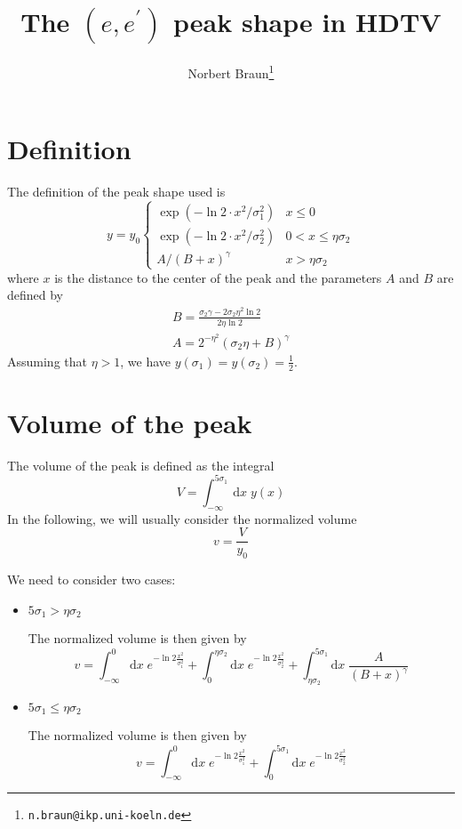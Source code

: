 \documentclass[a4paper]{article}
\begin{document}
\title{The $(e,e^\prime)$ peak shape in HDTV}
\author{Norbert Braun\thanks{\texttt{n.braun@ikp.uni-koeln.de}}}
\maketitle
\section{Definition}
The definition of the peak shape used is
\begin{equation}
y = y_0 \left\{ 
\begin{array}{ll}
\exp(-\ln 2 \cdot x^2/\sigma_1^2) & x \le 0\\
\exp(-\ln 2 \cdot x^2/\sigma_2^2) & 0 < x \le \eta\sigma_2\\
A / (B + x)^\gamma                & x > \eta\sigma_2
\end{array}
\right.
\end{equation}
where $x$ is the distance to the center of the peak and the parameters $A$ and $B$ are defined by
\begin{eqnarray}
B = \frac{\sigma_2\gamma - 2\sigma_2 \eta^2 \ln 2}{2 \eta \ln 2}\\
A = 2^{-\eta^2} (\sigma_2\eta + B)^\gamma
\end{eqnarray}
Assuming that $\eta > 1$, we have $y(\sigma_1) = y(\sigma_2) = \frac{1}{2}$.

\section{Volume of the peak}
The volume of the peak is defined as the integral
\begin{equation}
V = \int_{-\infty}^{5\sigma_1} \mathrm{d}x\; y(x)
\end{equation}
In the following, we will usually consider the normalized volume
\begin{equation}
v = \frac{V}{y_0}
\end{equation}

We need to consider two cases:
\begin{itemize}
\item $5\sigma_1 > \eta\sigma_2$

The normalized volume is then given by
\begin{equation}
v = \int_{-\infty}^0 \mathrm{d}x\;e^{-\ln 2 \frac{x^2}{\sigma_1^2}}
+ \int_0^{\eta\sigma_2}\mathrm{d}x\;e^{-\ln 2 \frac{x^2}{\sigma_2^2}}
+ \int_{\eta\sigma_2}^{5 \sigma_1}\mathrm{d}x\;\frac{A}{(B + x)^\gamma}
\end{equation}
\item $5\sigma_1 \le \eta\sigma_2$

The normalized volume is then given by
\begin{equation}
v = \int_{-\infty}^0 \mathrm{d}x\;e^{-\ln 2 \frac{x^2}{\sigma_1^2}}
+ \int_0^{5\sigma_1}\mathrm{d}x\;e^{-\ln 2 \frac{x^2}{\sigma_2^2}}
\end{equation}
\end{itemize}
\end{document}
